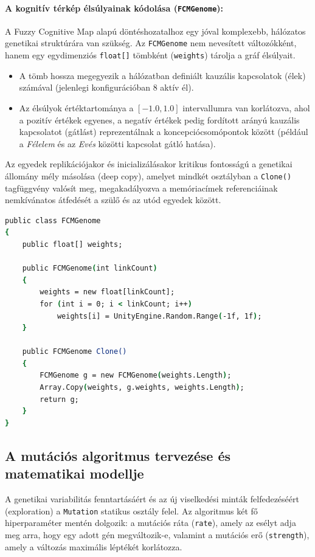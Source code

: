\paragraph{A kognitív térkép élsúlyainak kódolása (\texttt{FCMGenome}):}
A Fuzzy Cognitive Map alapú döntéshozatalhoz egy jóval komplexebb, hálózatos genetikai struktúrára van szükség. Az \texttt{FCMGenome} nem nevesített változókként, hanem egy egydimenziós \texttt{float[]} tömbként (\texttt{weights}) tárolja a gráf élsúlyait. 
\begin{itemize}
    \item A tömb hossza megegyezik a hálózatban definiált kauzális kapcsolatok (élek) számával (jelenlegi konfigurációban 8 aktív él).
    \item Az élsúlyok értéktartománya a $[-1.0, 1.0]$ intervallumra van korlátozva, ahol a pozitív értékek egyenes, a negatív értékek pedig fordított arányú kauzális kapcsolatot (gátlást) reprezentálnak a koncepciócsomópontok között (például a \textit{Félelem} és az \textit{Evés} közötti kapcsolat gátló hatása).
\end{itemize}

Az egyedek replikációjakor és inicializálásakor kritikus fontosságú a genetikai állomány mély másolása (deep copy), amelyet mindkét osztályban a \texttt{Clone()} tagfüggvény valósít meg, megakadályozva a memóriacímek referenciáinak nemkívánatos átfedését a szülő és az utód egyedek között.

\begin{lstlisting}[language=csh, caption={Az FCMGenome osztály felépítése}, label={lst:fcm_genome}]
public class FCMGenome
{
    public float[] weights;

    public FCMGenome(int linkCount)
    {
        weights = new float[linkCount];
        for (int i = 0; i < linkCount; i++)
            weights[i] = UnityEngine.Random.Range(-1f, 1f);
    }

    public FCMGenome Clone()
    {
        FCMGenome g = new FCMGenome(weights.Length);
        Array.Copy(weights, g.weights, weights.Length);
        return g;
    }
}
\end{lstlisting}

\subsection{A mutációs algoritmus tervezése és matematikai modellje}

A genetikai variabilitás fenntartásáért és az új viselkedési minták felfedezéséért (exploration) a \texttt{Mutation} statikus osztály felel. Az algoritmus két fő hiperparaméter mentén dolgozik: a mutációs ráta (\texttt{rate}), amely az esélyt adja meg arra, hogy egy adott gén megváltozik-e, valamint a mutációs erő (\texttt{strength}), amely a változás maximális léptékét korlátozza.

